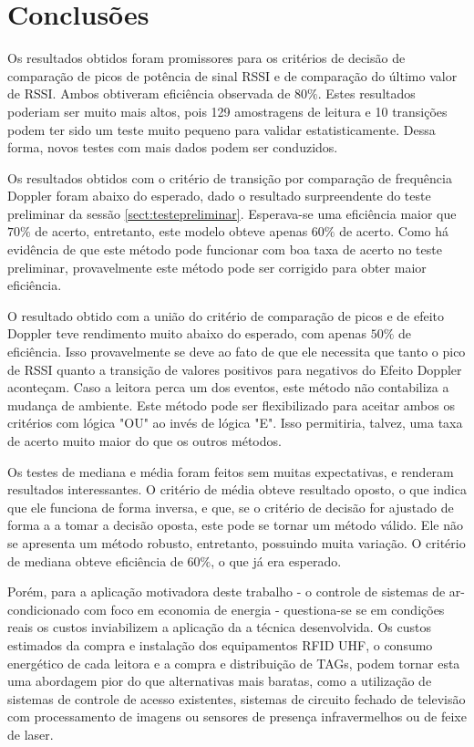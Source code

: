 
\chapter{Conclusões} \label{chap:Conclusao}

\label{CapConclusoes}

Os resultados obtidos foram promissores para os critérios de decisão de comparação de picos de potência de sinal RSSI e de comparação do último valor de RSSI. Ambos obtiveram eficiência observada de $80\%$. Estes resultados poderiam ser muito mais altos, pois 129 amostragens de leitura e 10 transições podem ter sido um teste muito pequeno para validar estatisticamente. Dessa forma, novos testes com mais dados podem ser conduzidos.

Os resultados obtidos com o critério de transição por comparação de frequência Doppler foram abaixo do esperado, dado o resultado surpreendente do teste preliminar da sessão \ref{sect:testepreliminar}. Esperava-se uma eficiência maior que $70\%$ de acerto, entretanto, este modelo obteve apenas $60\%$ de acerto. Como há evidência de que este método pode funcionar com boa taxa de acerto no teste preliminar, provavelmente este método pode ser corrigido para obter maior eficiência.

O resultado obtido com a união do critério de comparação de picos e de efeito Doppler teve rendimento muito abaixo do esperado, com apenas $50\%$ de eficiência. Isso provavelmente se deve ao fato de que ele necessita que tanto o pico de RSSI quanto a transição de valores positivos para negativos do Efeito Doppler aconteçam. Caso a leitora perca um dos eventos, este método não contabiliza a mudança de ambiente. Este método pode ser flexibilizado para aceitar ambos os critérios com lógica "OU" ao invés de lógica "E". Isso permitiria, talvez, uma taxa de acerto muito maior do que os outros métodos.

Os testes de mediana e média foram feitos sem muitas expectativas, e renderam resultados interessantes. O critério de média obteve resultado oposto, o que indica que ele funciona de forma inversa, e que, se o critério de decisão for ajustado de forma a a tomar a decisão oposta, este pode se tornar um método válido. Ele não se apresenta um método robusto, entretanto, possuindo muita variação. O critério de mediana obteve eficiência de $60\%$, o que já era esperado.

Porém, para a aplicação motivadora deste trabalho - o controle de sistemas de ar-condicionado com foco em economia de energia - questiona-se se em condições reais os custos inviabilizem a aplicação da a técnica desenvolvida. Os custos estimados da compra e instalação dos equipamentos RFID UHF, o consumo energético de cada leitora e a compra e distribuição de TAGs, podem tornar esta uma abordagem pior do que alternativas mais baratas, como a utilização de sistemas de controle de acesso existentes, sistemas de circuito fechado de televisão com processamento de imagens ou sensores de presença infravermelhos ou de feixe de laser.

